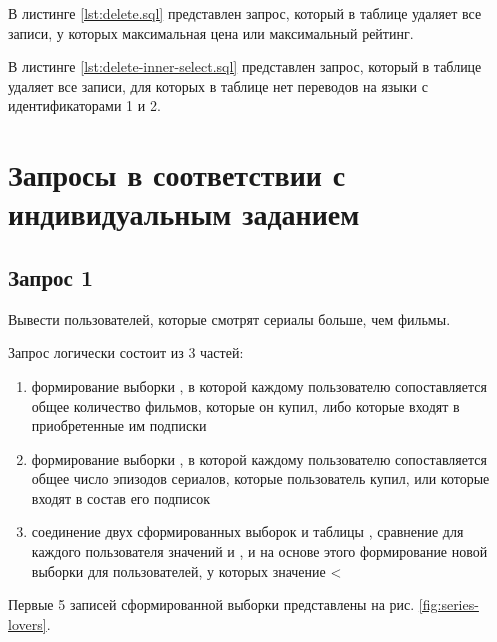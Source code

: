 В листинге \ref{lst:delete.sql} представлен запрос, который в таблице  удаляет все записи, у которых максимальная цена или максимальный рейтинг.



В листинге \ref{lst:delete-inner-select.sql} представлен запрос, который в таблице  удаляет все записи, для которых в таблице  нет переводов на языки с идентификаторами 1 и 2.



\section{Запросы в соответствии с индивидуальным заданием}

\subsection{Запрос 1}

Вывести пользователей, которые смотрят сериалы больше, чем фильмы.



Запрос логически состоит из 3 частей:

\begin{enumerate}
	\item формирование выборки , в которой каждому пользователю сопоставляется общее количество фильмов, которые он купил, либо которые входят в приобретенные им подписки
	\item формирование выборки , в которой каждому пользователю сопоставляется общее число эпизодов сериалов, которые пользователь купил, или которые входят в состав его подписок
	\item соединение двух сформированных выборок и таблицы , сравнение для каждого пользователя значений  и , и на основе этого формирование новой выборки для пользователей, у которых значение  < 
\end{enumerate}

Первые 5 записей сформированной выборки представлены на рис. \ref{fig:series-lovers}.

